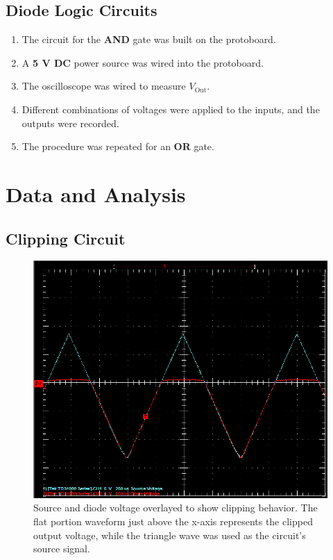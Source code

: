 \documentclass[twocolumn,english]{IEEEtran}
\begin{document}
\subsection{Diode Logic Circuits}
  \begin{enumerate}
   \item The circuit for the \textbf{AND} gate was built on the protoboard.
   \item A \textbf{5 V DC} power source was wired into the protoboard.
   \item The oscilloscope was wired to measure $V_{\text{Out}}$.
   \item Different combinations of voltages were applied to the inputs, and the outputs were recorded.
   \item The procedure was repeated for an \textbf{OR} gate.
  \end{enumerate}

\noindent\hrulefill


\section{Data and Analysis}

\subsection{\textbf{Clipping Circuit}}

\begin{figure}[h]
  \begin{centering}
  \begin{center}
  \includegraphics[width=\linewidth]{./Circuit_1.png}
  \caption{Source and diode voltage overlayed to show clipping behavior. The flat portion waveform just above the x-axis represents the clipped output voltage, while the triangle wave was used as the circuit's source signal.}
  \label{fig:circuit_1_results}
  \end{center}
  \par\end{centering}
\end{figure}
\end{document}
